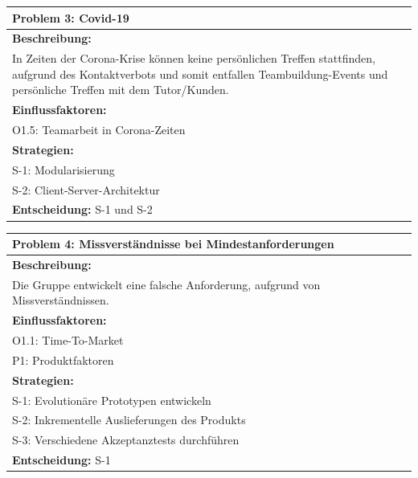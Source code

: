 \documentclass[fontsize=12pt,paper=a4,twoside]{scrartcl}
\begin{document}
\begin{longtable}{|p{15cm}|}
\hline
Problem 3: Covid-19                                                                           
\\ \hline                                                                                                                                                                                                                                                                                                                                                                                                                                                                                                                                                        
\textbf{Beschreibung:} \\
In Zeiten der Corona-Krise können keine persönlichen Treffen stattfinden, aufgrund des Kontaktverbots
und somit entfallen Teambuildung-Events und persönliche Treffen mit dem Tutor/Kunden.
\\ \hline
\textbf{Einflussfaktoren:} \\
O1.5: Teamarbeit in Corona-Zeiten
\\ \hline
\textbf{Strategien:} \\
S-1: Modularisierung \\
S-2: Client-Server-Architektur
 \\ \hline
 \textbf{Entscheidung:} S-1 und S-2
\\ \hline
\end{longtable}

\begin{longtable}{|p{15cm}|}
\hline
Problem 4: Missverständnisse bei Mindestanforderungen                                                                           
\\ \hline                                                                                                                                                                                                                                                                                                                                                                                                                                                                                                                                                        
\textbf{Beschreibung:} \\
Die Gruppe entwickelt eine falsche Anforderung, aufgrund von Missverständnissen.
\\ \hline
\textbf{Einflussfaktoren:} \\
O1.1: Time-To-Market \\
P1: Produktfaktoren
\\ \hline
\textbf{Strategien:} \\
S-1: Evolutionäre Prototypen entwickeln \\
S-2: Inkrementelle Auslieferungen des Produkts \\
S-3: Verschiedene Akzeptanztests durchführen
 \\ \hline
 \textbf{Entscheidung:} S-1
\\ \hline
\end{longtable}
\end{document}
